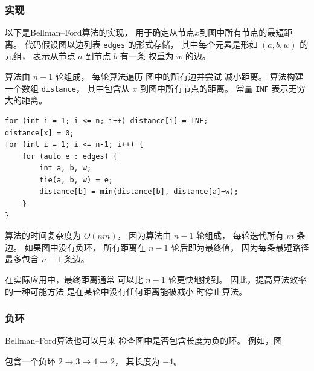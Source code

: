 \subsubsection{实现}

以下是Bellman–Ford算法的实现，
用于确定从节点$x$到图中所有节点的最短距离。
代码假设图以边列表 \texttt{edges} 的形式存储，
其中每个元素是形如 $(a,b,w)$ 的元组，
表示从节点 $a$ 到节点 $b$ 有一条
权重为 $w$ 的边。

算法由 $n-1$ 轮组成，
每轮算法遍历
图中的所有边并尝试
减小距离。
算法构建一个数组 \texttt{distance}，
其中包含从 $x$ 
到图中所有节点的距离。
常量 \texttt{INF} 表示无穷大的距离。

\begin{lstlisting}
for (int i = 1; i <= n; i++) distance[i] = INF;
distance[x] = 0;
for (int i = 1; i <= n-1; i++) {
    for (auto e : edges) {
        int a, b, w;
        tie(a, b, w) = e;
        distance[b] = min(distance[b], distance[a]+w);
    }
}
\end{lstlisting}

算法的时间复杂度为 $O(nm)$，
因为算法由 $n-1$ 轮组成，
每轮迭代所有 $m$ 条边。
如果图中没有负环，
所有距离在 $n-1$ 轮后即为最终值，
因为每条最短路径最多包含 $n-1$ 条边。

在实际应用中，最终距离通常
可以比 $n-1$ 轮更快地找到。
因此，提高算法效率的一种可能方法
是在某轮中没有任何距离能被减小
时停止算法。

\subsubsection{负环}


Bellman–Ford算法也可以用来
检查图中是否包含长度为负的环。
例如，图

\begin{center}
\end{center}
\noindent
包含一个负环
$2 \rightarrow 3 \rightarrow 4 \rightarrow 2$，
其长度为 $-4$。

